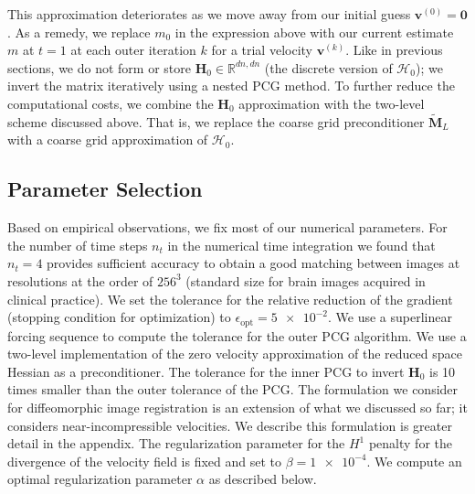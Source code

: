 \documentclass[11pt]{amsart}
\newcommand\op[1]{\ensuremath{\mathcal{#1}}}
\newcommand\di[1]{\ensuremath{\mathbf{#1}}}
\newcommand\scinum[1]{\num[round-precision=0,round-mode=places,tight-spacing=true,retain-zero-exponent=true,retain-explicit-plus=true,output-exponent-marker=\text{e}]{#1}}
\begin{document}
This approximation deteriorates as we move away from our initial guess $\di{v}^{(0)} = \di{0}$. As a remedy, we replace $m_0$ in the expression above with our current estimate $m$ at $t=1$ at each outer iteration $k$ for a trial velocity $\di{v}^{(k)}$. Like in previous sections, we do not form or store $\di{H}_0 \in \mathbb{R}^{dn,dn}$ (the discrete version of $\op{H}_0$); we invert the matrix iteratively using a nested PCG method. To further reduce the computational costs, we combine the $\di{H}_0$ approximation with the two-level scheme discussed above. That is, we replace the coarse grid preconditioner $\di{\tilde{M}}_L$ with a coarse grid approximation of  $\op{H}_{0}$.




\subsection{Parameter Selection}\label{s:paratuning}

Based on empirical observations, we fix most of our numerical parameters. For the number of time steps $n_t$ in the numerical time integration we found that $n_t = 4$ provides sufficient accuracy to obtain a good matching between images at resolutions at the order of $256^3$ (standard size for brain images acquired in clinical practice). We set the tolerance for the relative reduction of the gradient (stopping condition for optimization) to $\epsilon_{\text{opt}} = \scinum{5e-2}$. We use a superlinear forcing sequence to compute the tolerance for the outer PCG algorithm. We use a two-level implementation of the zero velocity approximation of the reduced space Hessian as a preconditioner. The tolerance for the inner PCG to invert $\di{H}_0$ is 10 times smaller than the outer tolerance of the PCG. The formulation we consider for diffeomorphic image registration is an extension of what we discussed so far; it considers near-incompressible velocities. We describe this formulation is greater detail in the appendix. The regularization parameter for the $H^1$ penalty for the divergence of the velocity field is fixed and set to $\beta = \scinum{1e-4}$. We compute an optimal regularization parameter $\alpha$ as described below.
\end{document}
